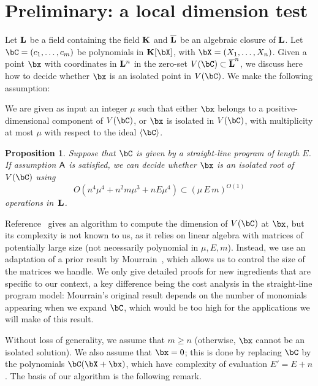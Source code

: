 \documentclass[12pt]{article}
\newtheorem{proposition}[definition]{Proposition}
\begin{document}

\section{Preliminary: a local dimension test} \label{sec:isolated}

Let $\mathbf{L}$ be a field containing the field $\mathbf{K}$ and $\overline{\mathbf{L}}$ be an
algebraic closure of $\mathbf{L}$.  Let $\bC=(c_1,\dots,c_m)$ be polynomials
in $\KK[\bX]$, with $\bX=(X_1,\dots,X_n)$. Given a point $\bx$ with
coordinates in $\mathbf{L}^n$ in the zero-set $V(\bC)\subset \LLbar^n$, we
discuss here how to decide whether $\bx$ is an isolated point in
$V(\bC)$. We make the following assumption:
\begin{description}[leftmargin=*]
\item [$\assH.$] We are given as input an integer $\mu$ such that
 either $\bx$ belongs to a positive-dimensional component of $V(\bC)$,
 or $\bx$ is isolated in $V(\bC)$, with multiplicity at most $\mu$
  with respect to the ideal $\langle \bC\rangle$.
\end{description}

\begin{proposition}\label{prop:testisolated}
  Suppose that $\bC$ is given by a straight-line program of length $E$.
  If assumption $\mathsf{A}$ is satisfied, we can decide whether $\bx$ is an
  isolated root of $V(\bC)$ using 
$$O(n^4 \mu^4 + n^2 m \mu^3 + n E \mu^4) \subset (\mu\,E\,m)^{O(1)}$$ operations in~$\mathbf{L}$.
\end{proposition}
Reference~\cite{BaHaPeSo09} gives an algorithm to compute the
dimension of $V(\bC)$ at $\bx$, but its complexity is not known to us,
as it relies on linear algebra with matrices of potentially large size
(not necessarily polynomial in $\mu,E,m$).  Instead, we use an
adaptation of a prior result by Mourrain~\cite{Mourrain97}, which
allows us to control the size of the matrices we handle. We only give
detailed proofs for new ingredients that are specific to our context,
a key difference being the cost analysis in the straight-line program
model: Mourrain's original result depends on the number of monomials
appearing when we expand $\bC$, which would be too high for the
applications we will make of this result.

Without loss of generality, we assume that $m\ge n$ (otherwise, $\bx$
cannot be an isolated solution). We also assume that $\bx=0$; this is
done by replacing $\bC$ by the polynomials $\bC(\bX+\bx)$, which have
complexity of evaluation $E'=E+n$.  The basis of our algorithm is the
following remark.
\end{document}
